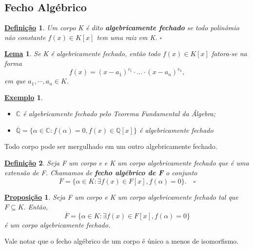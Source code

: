 \documentclass{article}
\newtheorem*{def*}{\underline{Defini\c c\~ao}}
\newtheorem*{lemma*}{\underline{Lema}}
\newtheorem*{prop*}{\underline{Proposi\c c\~ao}}
\newtheorem{example}{\underline{Exemplo}}
\begin{document}
\subsection{Fecho Algébrico}
\begin{def*}
  Um corpo K é dito \textbf{algebricamente fechado} se todo polinômio não constante \(f(x)\in K[x]\) tem
  uma raiz em K. \(\square\)
\end{def*}
\begin{lemma*}
  Se K é algebricamente fechado, então todo \(f(x)\in K[x]\) fatora-se na forma 
  \[
    f(x) = (x-a_{1})^{r_{1}}\cdot \dotsc \cdot (x-a_{n})^{r_{n}},
  \]
  em que \(a_{1}, \cdots, a_{n}\in K\).
\end{lemma*}
\begin{example}
  \begin{itemize}
    \item[1)] \(\mathbb{C}\) é algebricamente fechado pelo Teorema Fundamental da Álgebra;
    \item[2)] \(\overline{\mathbb{Q}} = \{\alpha \in \mathbb{C}: f(\alpha ) = 0, f(x)\in \mathbb{Q}[x]\}\) é algebricamente fechado
  \end{itemize}
\end{example}
Todo corpo pode ser mergulhado em um outro algebricamente fechado.
\begin{def*}
  Seja F um corpo e e K um corpo algebricamente fechado que é uma extensão de F. Chamamos de
  \textbf{fecho algébrico de F} o conjunto 
  \[
    \overline{F} = \{\alpha \in K: \exists f(x)\in F[x], f(\alpha ) = 0\}.\quad\square
  \]
\end{def*}
\begin{prop*}
  Seja F um corpo e K um corpo algebricamente fechado tal que \(F \subseteq{K}.\) Então, 
  \[
    \overline{F} = \{\alpha \in K: \exists f(x)\in F[x], f(\alpha ) = 0\}
  \]
  é um corpo algebricamente fechado.
\end{prop*}
Vale notar que o fecho algébrico de um corpo é único a menos de isomorfismo.
\end{document}
